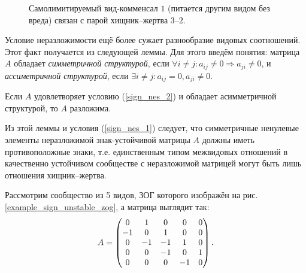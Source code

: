     \begin{figure}[H]
        \centering
        \caption{Самолимитируемый вид-комменсал \(1\) (питается другим видом без вреда) связан с парой хищник--жертва \(3\)--\(2\).} \label{example_sign_zog_3}
    \end{figure}

    Условие неразложимости ещё более сужает разнообразие видовых соотношений. Этот факт получается из следующей леммы. Для этого введём понятия: матрица \(A\) обладает \textit{симметричной структурой}, если \(\forall i \neq j : a_{ij} \neq 0 \Rightarrow a_{ji} \neq 0 \), и \textit{ассиметричной структурой}, если \(\exists i \neq j : a_{ij} = 0, a_{ji} \neq 0 \).

    \begin{lemma}
        Если \(A\) удовлетворяет условию (\ref{sign_nes_2}) и обладает асимметричной структурой, то \(A\) разложима. \cite{svilog}
    \end{lemma}

    Из этой леммы и условия (\ref{sign_nes_1}) следует, что симметричные ненулевые элементы неразложимой знак-устойчивой матрицы \(A\) должны иметь противоположные знаки, т.е. единственным типом межвидовых отношений в качественно устойчивом сообществе с неразложимой матрицей могут быть лишь отношения хищник--жертва. 

    Рассмотрим сообщество из 5 видов, ЗОГ которого изображён на рис. \ref{example_sign_unstable_zog}, а матрица выглядит так:
    \begin{equation}
        A = \left(  \begin{matrix}
            0 & 1 & 0 & 0 & 0 \\
            -1& 0 & 1 & 0 & 0 \\
            0 &-1 &-1 & 1 & 0 \\
            0 & 0 &-1 & 0 & 1 \\
            0 & 0 & 0 &-1 & 0
        \end{matrix}  \right).
    \end{equation}
    
